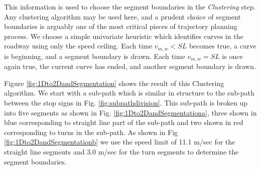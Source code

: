 \documentclass[letterpaper, 10 pt, conference]{ieeeconf}  %
\begin{document}
This information is used to choose the segment boundaries in the {\it Clustering} step.
Any clustering algorithm may be used here, and a prudent choice of segment boundaries is arguably one of the most critical pieces of trajectory planning process.
We choose a simple univariate heuristic which identifies curves in the roadway using only the speed ceiling.
Each time $v_{m,w} < SL$ becomes true, a curve is beginning, and a segment boundary is drawn.
Each time $v_{m,w} = SL$ is once again true, the current curve has ended, and another segment boundary is drawn.

Figure \ref{fig:1Dto2DandSegmentation} shows the result of this Clustering algorithm. 
We start with a sub-path which is similar in structure to the sub-path between the stop signs in Fig. \ref{fig:subpathdivision}. This sub-path is broken up into five segments as shown in Fig. \ref{fig:1Dto2DandSegmentationa}, three shown in blue corresponding to straight line part of the sub-path and two shown in red corresponding to turns in the sub-path. As shown in Fig \ref{fig:1Dto2DandSegmentationb} we use the speed limit of 11.1 m/sec for the straight line segments and 3.0 m/sec for the turn segments to determine the segment boundaries. 
 
\end{document}
